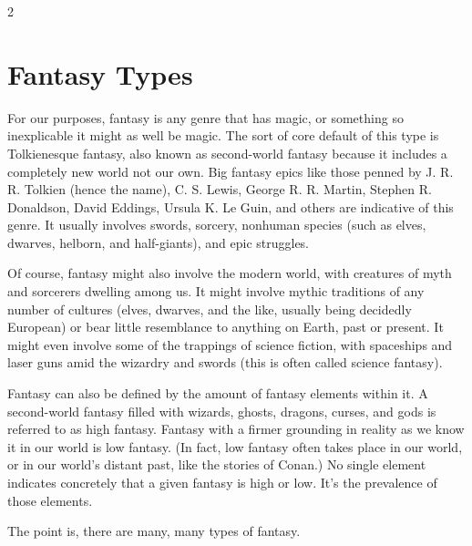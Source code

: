 \begin{multicols}{2}

\chapter{Fantasy Types}

For our purposes, fantasy is any genre that has magic, or something so inexplicable it might as well be magic. The sort of core default of this type is Tolkienesque fantasy, also known as second-world fantasy because it includes a completely new world not our own. Big fantasy epics like those penned by J. R. R. Tolkien (hence the name), C. S. Lewis, George R. R. Martin, Stephen R. Donaldson, David Eddings, Ursula K. Le Guin, and others are indicative of this genre. It usually involves swords, sorcery, nonhuman species (such as elves, dwarves, helborn, and half-giants), and epic struggles.

Of course, fantasy might also involve the modern world, with creatures of myth and sorcerers dwelling among us. It might involve mythic traditions of any number of cultures (elves, dwarves, and the like, usually being decidedly European) or bear little resemblance to anything on Earth, past or present. It might even involve some of the trappings of science fiction, with spaceships and laser guns amid the wizardry and swords (this is often called science fantasy).

Fantasy can also be defined by the amount of fantasy elements within it. A second-world fantasy filled with wizards, ghosts, dragons, curses, and gods is referred to as high fantasy. Fantasy with a firmer grounding in reality as we know it in our world is low fantasy. (In fact, low fantasy often takes place in our world, or in our world’s distant past, like the stories of Conan.) No single element indicates concretely that a given fantasy is high or low. It’s the prevalence of those elements.

The point is, there are many, many types of fantasy.

\end{multicols}

